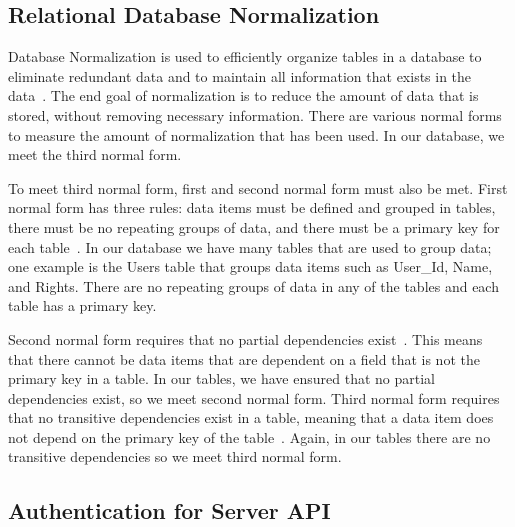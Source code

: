\documentclass[12pt]{report}
\let\Oldsubsection\subsection
\renewcommand{\subsection}{\FloatBarrier\Oldsubsection}
\begin{document}
\subsection{Relational Database Normalization} \label{relational-database-normalization}

Database Normalization is used to efficiently organize tables in a database to eliminate redundant
data and to maintain all information that exists in the data~\autocite{DBNORMALIZATION}.
The end goal of normalization is to
reduce the amount of data that is stored, without removing necessary information. There are various
normal forms to measure the amount of normalization that has been used. In our database, we meet
the third normal form.

To meet third normal form, first and second normal form must also be met. First normal form
has three rules: data items must be defined and grouped in tables, there must be no repeating
groups of data, and there must be a primary key for each table~\autocite{FIRSTNORMALFORM}.
In our database we have many tables
that are used to group data; one example is the Users table that groups data items such as User\_Id,
Name, and Rights. There are no repeating groups of data in any of the tables and each table has a
primary key.

Second normal form requires that no partial dependencies exist~\autocite{SECONDNORMALFORM}. This means that there
cannot be data items that are dependent on a field that is not the primary key in a table. In our
tables, we have ensured that no partial dependencies exist, so we meet second normal form.
Third normal form requires that no transitive dependencies exist in a table, meaning that a data item
does not depend on the primary key of the table~\autocite{THIRDNORMALFORM}. Again, in our tables there
are no transitive dependencies so we meet third normal form.

\subsection{Authentication for Server API} \label{authentication-for-server-api}

\end{document}
